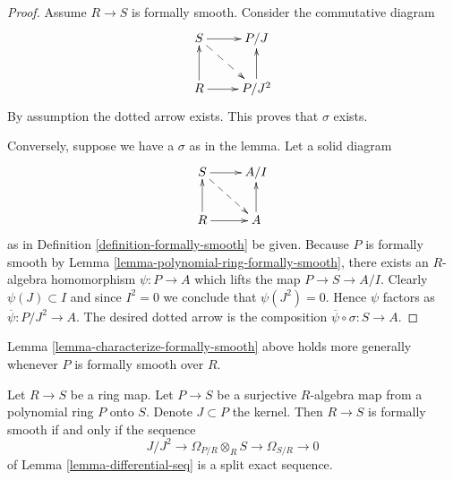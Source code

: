 \begin{proof}
Assume $R \to S$ is formally smooth.
Consider the commutative diagram
$$
\xymatrix{
S \ar[r] \ar@{-->}[rd] & P/J \\
R \ar[r] \ar[u] &  P/J^2\ar[u]
}
$$
By assumption the dotted arrow exists. This proves that
$\sigma$ exists.

\medskip\noindent
Conversely, suppose we have a $\sigma$ as in the lemma.
Let a solid diagram
$$
\xymatrix{
S \ar[r] \ar@{-->}[rd] & A/I \\
R \ar[r] \ar[u] & A \ar[u]
}
$$
as in Definition \ref{definition-formally-smooth} be given.
Because $P$ is formally smooth by
Lemma \ref{lemma-polynomial-ring-formally-smooth},
there exists an $R$-algebra homomorphism
$\psi : P \to A$ which lifts the map $P \to S \to A/I$.
Clearly $\psi(J) \subset I$ and since $I^2 = 0$ we conclude that
$\psi(J^2) = 0$. Hence $\psi$ factors as
$\overline{\psi} : P/J^2 \to A$. The desired dotted arrow
is the composition $\overline{\psi} \circ \sigma : S \to A$.
\end{proof}

\begin{remark}
\label{remark-lemma-characterize-formally-smooth}
Lemma \ref{lemma-characterize-formally-smooth} above holds more
generally whenever $P$ is formally smooth over $R$.
\end{remark}

\begin{lemma}
\label{lemma-characterize-formally-smooth-again}
Let $R \to S$ be a ring map.
Let $P \to S$ be a surjective $R$-algebra map from a
polynomial ring $P$ onto $S$. Denote $J \subset P$ the
kernel. Then $R \to S$ is formally smooth if and only
if the sequence
$$
J/J^2 \to \Omega_{P/R} \otimes_R S \to \Omega_{S/R} \to 0
$$
of Lemma \ref{lemma-differential-seq} is a split exact sequence.
\end{lemma}


